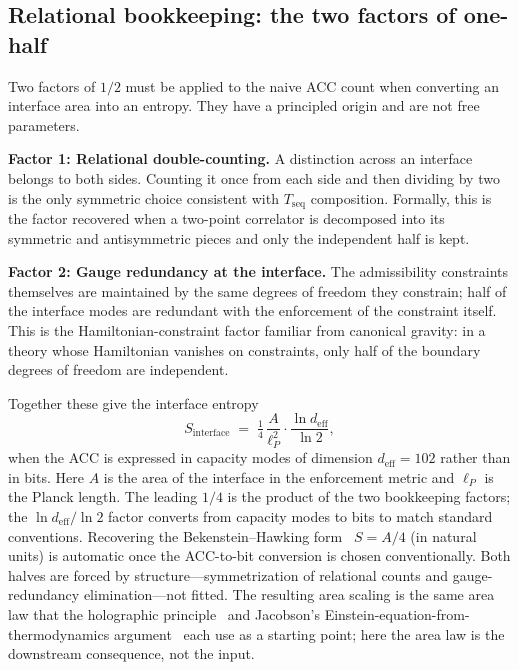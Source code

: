 \documentclass[11pt]{article}
\begin{document}
\subsection{Relational bookkeeping: the two factors of one-half}
\label{subsec:gcc_bookkeeping}

Two factors of $1/2$ must be applied to the naive ACC count when converting
an interface area into an entropy.  They have a principled origin and are
not free parameters.

\smallskip\noindent\textbf{Factor 1: Relational double-counting.}
A distinction across an interface belongs to both sides.  Counting it once
from each side and then dividing by two is the only symmetric choice
consistent with $T_{\mathrm{seq}}$ composition.  Formally, this is the
factor recovered when a two-point correlator is decomposed into its
symmetric and antisymmetric pieces and only the independent half is kept.

\smallskip\noindent\textbf{Factor 2: Gauge redundancy at the interface.}
The admissibility constraints themselves are maintained by the same degrees
of freedom they constrain; half of the interface modes are redundant with
the enforcement of the constraint itself.  This is the Hamiltonian-constraint
factor familiar from canonical gravity: in a theory whose Hamiltonian
vanishes on constraints, only half of the boundary degrees of freedom are
independent.

Together these give the interface entropy
\[
  S_{\mathrm{interface}}
    \;=\; \tfrac{1}{4}\,\frac{A}{\ell_P^2} \cdot \frac{\ln d_{\mathrm{eff}}}{\ln 2},
\]
when the ACC is expressed in capacity modes of dimension
$d_{\mathrm{eff}}=102$ rather than in bits.  Here $A$ is the area of the
interface in the enforcement metric and $\ell_P$ is the Planck length.  The
leading $1/4$ is the product of the two bookkeeping factors; the
$\ln d_{\mathrm{eff}}/\ln 2$ factor converts from capacity modes to bits to
match standard conventions.  Recovering the Bekenstein--Hawking
form~\cite{Bekenstein1973,Hawking1975} $S = A/4$ (in natural units) is automatic
once the ACC-to-bit conversion is chosen conventionally.  Both halves are forced
by structure---symmetrization of relational counts and gauge-redundancy
elimination---not fitted.  The resulting area scaling is the same area law
that the holographic principle~\cite{tHooft1993,Susskind1995} and Jacobson's
Einstein-equation-from-thermodynamics argument~\cite{Jacobson1995} each use as
a starting point; here the area law is the downstream consequence, not the input.
\end{document}
